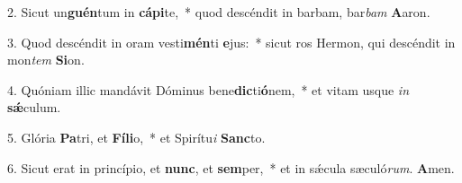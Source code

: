 2. Sicut un\textbf{guén}tum in \textbf{cá}\textbf{pi}te,~*  quod descéndit in barbam, bar\textit{bam} \textbf{A}aron.\

3. Quod descéndit in oram vesti\textbf{mén}ti \textbf{e}jus:~*  sicut ros Hermon, qui descéndit in mon\textit{tem} \textbf{Si}on.\

4. Quóniam illic mandávit Dóminus bene\textbf{dic}ti\textbf{ó}nem,~*  et vitam usque \textit{in} \textbf{sǽ}culum.\

5. Glória \textbf{Pa}tri, et \textbf{Fí}\textbf{li}o,~*  et Spirítu\textit{i} \textbf{Sanc}to.\

6. Sicut erat in princípio, et \textbf{nunc}, et \textbf{sem}per,~*  et in sǽcula sæculó\textit{rum}. \textbf{A}men.\

